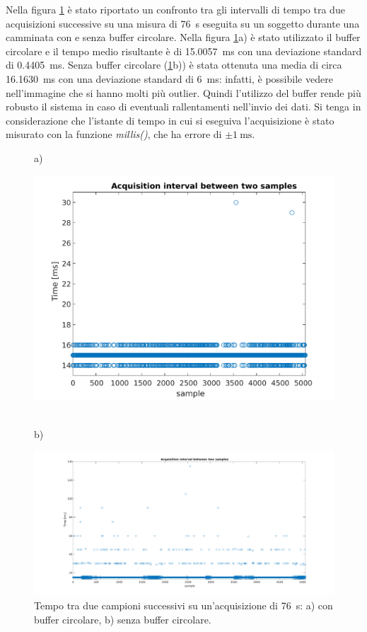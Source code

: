 Nella figura \ref{fig:time_interval} è stato riportato un confronto tra gli intervalli di tempo tra due acquisizioni successive su una misura di \SI{76}{\second} eseguita su un soggetto durante una camminata con e senza buffer circolare. Nella figura \ref{fig:time_interval}a) è stato utilizzato il buffer circolare e il tempo medio risultante è di \SI{15.0057}{\milli\second} con una deviazione standard di \SI{0.4405}{\milli\second}. Senza buffer circolare (\Fig\ref{fig:time_interval}b)) è stata ottenuta una media di circa \SI{16.1630}{\milli\second} con una deviazione standard di \SI{6}{\milli\second}: infatti, è possibile vedere nell'immagine che si hanno molti più outlier. Quindi l'utilizzo del buffer rende più robusto il sistema in caso di eventuali rallentamenti nell'invio dei dati. Si tenga in considerazione che l'istante di tempo in cui si eseguiva l'acquisizione è stato misurato con la funzione \textit{millis()}, che ha errore di $\pm \SI{1}{\milli\second}$. 
\begin{figure}[tbh]
	\centering
	a)
	\begin{minipage}{.900\textwidth}
		\includegraphics[width=0.8\linewidth]{./ImageFiles/interval_time.pdf}
	\end{minipage}
	\\b)
	\begin{minipage}{.900\textwidth}
		\includegraphics[width=\linewidth]{./ImageFiles/interval_time_2}
	\end{minipage}
	\caption{Tempo tra due campioni successivi su un'acquisizione di \SI{76}{\second}: a) con buffer circolare, b) senza buffer circolare.}
	\label{fig:time_interval}
\end{figure}

